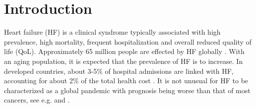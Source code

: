 \documentclass[../thesis.tex]{subfiles}
\begin{document}
\chapter{Introduction}
\label{chap:intro}

\noindent  Heart failure (HF) is a clinical syndrome typically associated with high prevalence, high mortality, frequent hospitalization and overall reduced quality of life (QoL). Approximately 65 million people are effected by HF globally \citep{hay2017global}. With an aging population, it is expected that the prevalence of HF is to increase. In developed countries, about 3-5\% of hospital admissions are linked with HF, accounting for about 2\% of the total health cost \citep{tripoliti2017heart}. It is not unusual for HF to be characterized as a global pandemic with prognosis being worse than that of most cancers, see e.g. \cite{braunwald2015war} and \cite{savarese2017global}.\\
\end{document}
